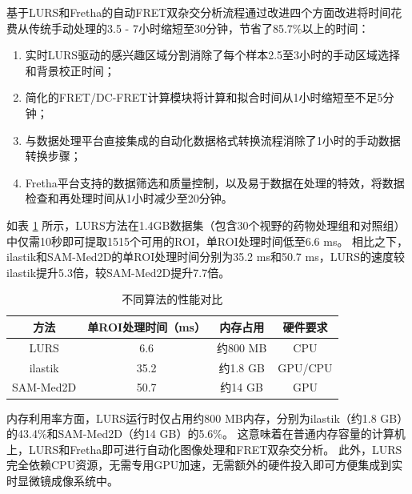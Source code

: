 基于LURS和Fretha的自动FRET双杂交分析流程通过改进四个方面改进将时间花费从传统手动处理的3.5 - 7小时缩短至30分钟，节省了85.7\%以上的时间：
\begin{enumerate}
  \item 实时LURS驱动的感兴趣区域分割消除了每个样本2.5至3小时的手动区域选择和背景校正时间；
  \item 简化的FRET/DC-FRET计算模块将计算和拟合时间从1小时缩短至不足5分钟；
  \item 与数据处理平台直接集成的自动化数据格式转换流程消除了1小时的手动数据转换步骤；
  \item Fretha平台支持的数据筛选和质量控制，以及易于数据在处理的特效，将数据检查和再处理时间从1小时减少至20分钟。
\end{enumerate}

如表 \ref{tab:性能对比} 所示，LURS方法在1.4GB数据集（包含30个视野的药物处理组和对照组）中仅需10秒即可提取1515个可用的ROI，单ROI处理时间低至6.6 ms。
相比之下，ilastik和SAM-Med2D的单ROI处理时间分别为35.2 ms和50.7 ms，LURS的速度较ilastik提升5.3倍，较SAM-Med2D提升7.7倍。
\begin{table}[htbp]
  \centering
  \caption{不同算法的性能对比}
  \begin{tabular}{cccc}
  \toprule[1.5pt]
  方法 & 单ROI处理时间（ms） & 内存占用 & 硬件要求 \\
  \midrule
  LURS & 6.6 & 约800 MB & CPU \\
  ilastik & 35.2 & 约1.8 GB & GPU/CPU \\
  SAM-Med2D & 50.7 & 约14 GB & GPU \\
  \bottomrule[1.5pt]
  \end{tabular}
  \label{tab:性能对比}
\end{table}

内存利用率方面，LURS运行时仅占用约800 MB内存，分别为ilastik（约1.8 GB）的43.4\%和SAM-Med2D（约14 GB）的5.6\%。
这意味着在普通内存容量的计算机上，LURS和Fretha即可进行自动化图像处理和FRET双杂交分析。
此外，LURS完全依赖CPU资源，无需专用GPU加速，无需额外的硬件投入即可方便集成到实时显微镜成像系统中。  

